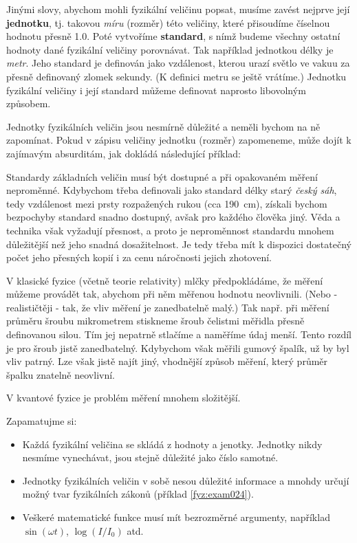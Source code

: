     Jinými slovy, abychom mohli fyzikální veličinu popsat, musíme zavést nejprve její
    \textbf{jednotku}, tj. takovou \emph{míru} (rozměr) této veličiny, které přisoudíme číselnou
    hodnotu přesně \num{1.0}. Poté vytvoříme \textbf{standard}, s nímž budeme všechny ostatní
    hodnoty dané fyzikální veličiny porovnávat. Tak například jednotkou délky je \emph{metr}. Jeho
    standard je definován jako vzdálenost, kterou urazí světlo ve vakuu za přesně definovaný zlomek
    sekundy. (K definici metru se ještě vrátíme.) Jednotku fyzikální veličiny i její standard můžeme
    definovat naprosto libovolným způsobem. 
    
    Jednotky fyzikálních veličin jsou nesmírně důležité a neměli bychom na ně zapomínat. Pokud v
    zápisu veličiny jednotku (rozměr) zapomeneme, může dojít k zajímavým absurditám, jak dokládá
    následující příklad:  

    

    Standardy základních veličin musí být dostupné a při opakovaném měření neproměnné. Kdybychom
    třeba definovali jako standard délky starý \emph{český sáh}, tedy vzdálenost mezi prsty
    rozpažených rukou (cca \qty{190}{\cm}), získali bychom bezpochyby standard snadno dostupný, avšak
    pro každého člověka jiný. Věda a technika však vyžadují přesnost, a proto je neproměnnost
    standardu mnohem důležitější než jeho snadná dosažitelnost. Je tedy třeba mít k dispozici
    dostatečný počet jeho přesných kopií i za cenu náročnosti jejich zhotovení.

    V klasické fyzice (včetně teorie relativity) mlčky předpokládáme, že měření můžeme provádět tak,
    abychom při něm měřenou hodnotu neovlivnili. (Nebo - realističtěji - tak, že vliv měření je
    zanedbatelně malý.) Tak např. při měření průměru šroubu mikrometrem stiskneme šroub čelistmi
    měřidla přesně definovanou silou. Tím jej nepatrně stlačíme a naměříme údaj menší. Tento rozdíl
    je pro šroub jistě zanedbatelný. Kdybychom však měřili gumový špalík, už by byl vliv patrný. Lze
    však jistě najít jiný, vhodnější způsob měření, který průměr špalku znatelně neovlivní. 
    
    V kvantové fyzice je problém měření mnohem složitější.

    \begin{tcnote}      
      Zapamatujme si:
      \begin{itemize}[leftmargin=10pt, noitemsep]
        \item Každá fyzikální veličina se skládá z hodnoty a jenotky. Jednotky nikdy nesmíme
              vynechávat, jsou stejně důležité jako číslo samotné.
        \item Jednotky fyzikálních veličin v sobě nesou důležité informace a mnohdy určují možný tvar
              fyzikálních zákonů (příklad \ref{fyz:exam024}).
        \item Veškeré matematické funkce musí mít bezrozměrné argumenty, například \(\sin(ωt)\),
              \(\log(I/I_0)\) atd.
      \end{itemize}
    \end{tcnote}

